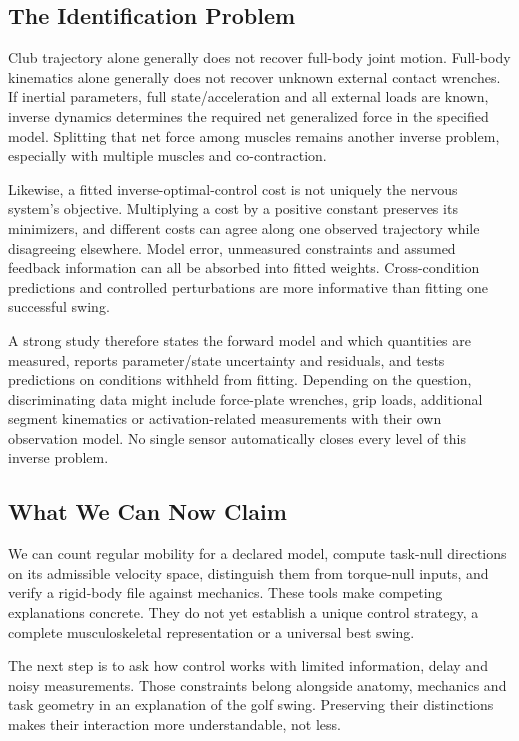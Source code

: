 \subsection{The Identification Problem}

Club trajectory alone generally does not recover full-body joint motion. Full-body kinematics alone generally does not recover unknown external contact wrenches. If inertial parameters, full state/acceleration and all external loads are known, inverse dynamics determines the required net generalized force in the specified model. Splitting that net force among muscles remains another inverse problem, especially with multiple muscles and co-contraction.

Likewise, a fitted inverse-optimal-control cost is not uniquely the nervous system's objective. Multiplying a cost by a positive constant preserves its minimizers, and different costs can agree along one observed trajectory while disagreeing elsewhere. Model error, unmeasured constraints and assumed feedback information can all be absorbed into fitted weights. Cross-condition predictions and controlled perturbations are more informative than fitting one successful swing.

A strong study therefore states the forward model and which quantities are measured, reports parameter/state uncertainty and residuals, and tests predictions on conditions withheld from fitting. Depending on the question, discriminating data might include force-plate wrenches, grip loads, additional segment kinematics or activation-related measurements with their own observation model. No single sensor automatically closes every level of this inverse problem.

\subsection{What We Can Now Claim}
\label{princ:prin:ch23_summary}

We can count regular mobility for a declared model, compute task-null directions on its admissible velocity space, distinguish them from torque-null inputs, and verify a rigid-body file against mechanics. These tools make competing explanations concrete. They do not yet establish a unique control strategy, a complete musculoskeletal representation or a universal best swing.

The next step is to ask how control works with limited information, delay and noisy measurements. Those constraints belong alongside anatomy, mechanics and task geometry in an explanation of the golf swing. Preserving their distinctions makes their interaction more understandable, not less.

